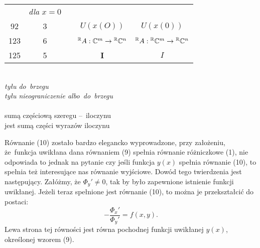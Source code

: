 \documentclass[a4paper,11pt]{article}
\begin{document}
\begin{center}
\begin{tabular}{|c|c|c|c|c|}
           & \textit{dla} $x = 0$ \\
    92  &  3 & & $U( x( O ) )$ & $U( x( 0 ) )$ \\[0.3em]
    123 &  6 & & $^{ \mathbb{R} }A : \mathbb{C}^{ m } \to { }^{ \mathbb{R} } \mathbb{C}^{ n }$
           & ${ }^{ \mathbb{R} }A : { }^{ \mathbb{R} } \mathbb{C}^{ m }
             \to { }^{ \mathbb{R} } \mathbb{C}^{ n }$ \\
    125 &  5 & & $\mathbf{I}$ & $I$ \\
    \hline
  \end{tabular}

\end{center}

\vspace{\spaceTwo}


\noindent
{} \\
\Jest  \textit{tyłu do~brzegu} \\
\Powin \textit{tyłu nieograniczenie albo~do~brzegu} \\
 \\
\Jest  sumą częściową szeregu --~iloczynu \\
\Powin jest sumą części wyrazów iloczynu \\














\vspace{0em}



\vspace{0em}


\noindent
{} Równanie (10) zostało bardzo elegancko wyprowadzone, przy
założeniu, że~funkcja uwikłana dana równaniem (9) spełnia
równanie różniczkowe (1), nie odpowiada to jednak na pytanie czy jeśli
funkcja $y( x )$ spełnia równanie (10), to spełnia też interesujące
nas równanie wyjściowe. Dowód tego twierdzenia jest następujący.
Załóżmy, że $\Phi_{ y }' \neq 0$, tak by było zapewnione istnienie
funkcji uwikłanej. Jeżeli teraz spełnione jest równanie (10), to można
je przekształcić do postaci:
\begin{equation}
  \label{MatwiejewMCRRZ-01}
  -\frac{ \Phi_{ x }' }{ \Phi_{ y }' } = f( x, y ).
\end{equation}
Lewa strona tej równości jest równa pochodnej funkcji uwikłanej
$y( x )$, określonej wzorem (9).
\end{document}
